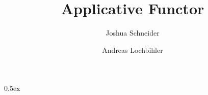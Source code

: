 \documentclass[11pt,a4paper]{article}
\begin{document}
\title{Applicative Functor}
\author{Joshua Schneider \and Andreas Lochbihler}
\maketitle

\begin{abstract}

\cite{hinze10,mcbride08}
\end{abstract}

\tableofcontents

\parindent 0pt\parskip 0.5ex





\end{document}
